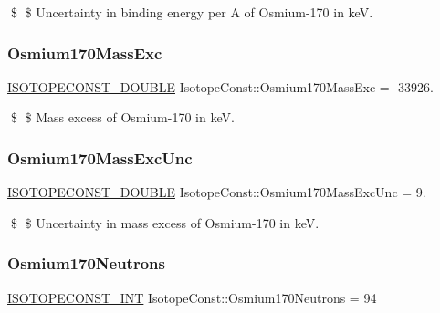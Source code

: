 \$ \$ Uncertainty in binding energy per A of Osmium-\/170 in keV. \mbox{\label{group___isotope_const-_osmium-_os170_ga864298d2d3f6c1d5372be017e88ae4d8}} 
\subsubsection{\texorpdfstring{Osmium170\+Mass\+Exc}{Osmium170MassExc}}
{\footnotesize\ttfamily \mbox{\hyperlink{group___isotope_const-_macros_ga8f45a7272ce02c0b4c65c44636ed719a}{I\+S\+O\+T\+O\+P\+E\+C\+O\+N\+S\+T\+\_\+\+D\+O\+U\+B\+LE}} Isotope\+Const\+::\+Osmium170\+Mass\+Exc = -\/33926.}

\$ \$ Mass excess of Osmium-\/170 in keV. \mbox{\label{group___isotope_const-_osmium-_os170_ga700744199f2bf60833b2e29957f86d54}} 
\subsubsection{\texorpdfstring{Osmium170\+Mass\+Exc\+Unc}{Osmium170MassExcUnc}}
{\footnotesize\ttfamily \mbox{\hyperlink{group___isotope_const-_macros_ga8f45a7272ce02c0b4c65c44636ed719a}{I\+S\+O\+T\+O\+P\+E\+C\+O\+N\+S\+T\+\_\+\+D\+O\+U\+B\+LE}} Isotope\+Const\+::\+Osmium170\+Mass\+Exc\+Unc = 9.}

\$ \$ Uncertainty in mass excess of Osmium-\/170 in keV. \mbox{\label{group___isotope_const-_osmium-_os170_ga8ea37541bcbe34c15651bb26935f1b55}} 
\subsubsection{\texorpdfstring{Osmium170\+Neutrons}{Osmium170Neutrons}}
{\footnotesize\ttfamily \mbox{\hyperlink{group___isotope_const-_macros_ga5f18360b3e99483a35c32d789e62621c}{I\+S\+O\+T\+O\+P\+E\+C\+O\+N\+S\+T\+\_\+\+I\+NT}} Isotope\+Const\+::\+Osmium170\+Neutrons = 94}

